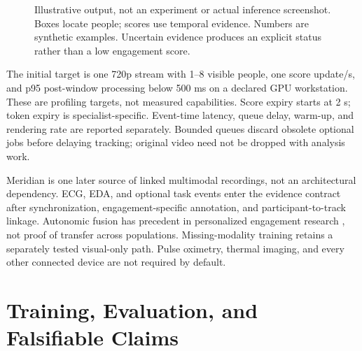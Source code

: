 \documentclass[a4paper,conference]{IEEEtran}
\begin{document}
\begin{figure}[t]
\centering
{}
\caption{Illustrative output, not an experiment or actual inference screenshot. Boxes locate people; scores use temporal evidence. Numbers are synthetic examples. Uncertain evidence produces an explicit status rather than a low engagement score.}
\label{fig:output}
\end{figure}

The initial target is one 720p stream with 1--8 visible people, one score update/s, and p95 post-window processing below 500 ms on a declared GPU workstation. These are profiling targets, not measured capabilities. Score expiry starts at 2 s; token expiry is specialist-specific. Event-time latency, queue delay, warm-up, and rendering rate are reported separately. Bounded queues discard obsolete optional jobs before delaying tracking; original video need not be dropped with analysis work.

Meridian is one later source of linked multimodal recordings, not an architectural dependency. ECG, EDA, and optional task events enter the evidence contract after synchronization, engagement-specific annotation, and participant-to-track linkage. Autonomic fusion has precedent in personalized engagement research \cite{rudovic}, not proof of transfer across populations. Missing-modality training retains a separately tested visual-only path. Pulse oximetry, thermal imaging, and every other connected device are not required by default.

\section{Training, Evaluation, and Falsifiable Claims}
\end{document}
